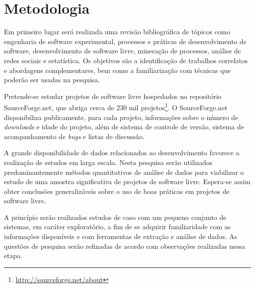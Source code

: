 \documentclass{article}
\begin{document}

\section{Metodologia}



Em primeiro lugar será realizada uma revisão bibliográfica de tópicos como
engenharia de software experimental, processos e práticas de desenvolvimento de
software, desenvolvimento de software livre, mineração de processos, análise de
redes sociais e estatística. Os objetivos são a identificação de trabalhos
correlatos e abordagens complementares, bem como a familiarização com técnicas
que poderão ser usadas na pesquisa.

Pretende-se estudar projetos de software livre hospedados no repositório
SourceForge.net, que abriga cerca de 230 mil
projetos\footnote{\url{http://sourceforge.net/about}}. O SourceForge.net
disponibiliza publicamente, para cada projeto, informações sobre o número de
\emph{downloads} e idade do projeto, além de sistema de controle de versão,
sistema de acompanhamento de \emph{bugs} e listas de discussão. 

A grande disponibilidade de dados relacionados ao desenvolvimento favorece a
realização de estudos em larga escala. Nesta pesquisa serão utilizados
predominantemente métodos quantitativos de análise de dados para viabilizar o
estudo de uma amostra significativa de projetos de software livre. Espera-se
assim obter conclusões generalizáveis sobre o uso de boas práticas em projetos
de software livre.

A princípio serão realizados estudos de caso com um pequeno conjunto de
sistemas, em caráter exploratório, a fim de se adquirir familiaridade com as
informações disponíveis e com ferramentas de extração e análise de dados. As
questões de pesquisa serão refinadas de acordo com observações realizadas nessa
etapa.
\end{document}
